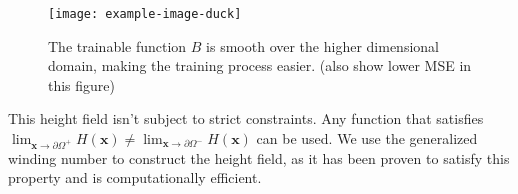 \begin{figure}
\centering
\texttt{[image: example-image-duck]}
\caption{
The trainable function $B$ is smooth over the higher dimensional domain, making the training process easier. (also show lower MSE in this figure)
} 
\label{fig:WhyEasier} 
\centering
\end{figure}


This height field isn't subject to strict constraints. Any function that satisfies 
$  \lim_{\mathbf{x} \to \partial \Omega^{+}} H(\mathbf{x}) \neq \lim_{\mathbf{x} \to \partial \Omega^{-}} H(\mathbf{x}) $
can be used. We use the generalized winding number to construct the height field, as it has been proven to satisfy this property \cite{Feng:2023:WND, Jacobson:2018:GWN, Barill:FW:2018} and is computationally efficient.






